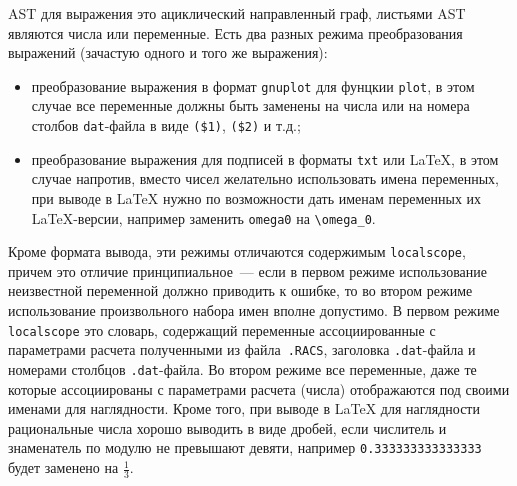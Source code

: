 \documentclass[12pt]{article}
\def\gnuplot{{\tt gnuplot}}
\begin{document}
AST для выражения это ациклический направленный граф, листьями AST являются числа или переменные. 
Есть два разных режима преобразования выражений (зачастую одного и того же выражения):
\begin{itemize}
\item преобразование выражения в формат \gnuplot{} для фунцкии \verb'plot',  в этом случае все переменные должны быть заменены на числа
  или на номера столбов \verb'dat'-файла  в виде \verb'($1)', \verb'($2)' и т.д.;
\item преобразование выражения для подписей в форматы \verb'txt' или \LaTeX{}, в этом случае напротив, вместо чисел желательно использовать имена переменных,
 при выводе в \LaTeX{} нужно по возможности дать именам переменных их \LaTeX-версии, например заменить \verb'omega0' на \verb'\omega_0'.
\end{itemize}
Кроме формата вывода, эти режимы отличаются содержимым \verb'localscope', причем это отличие принципиальное~--- если в первом режиме
использование неизвестной переменной должно приводить к ошибке, то во втором режиме использование произвольного набора имен вполне допустимо.
В первом режиме \verb'localscope' это словарь, содержащий переменные ассоциированные с параметрами расчета полученными из файла~\verb'.RACS',
заголовка \verb'.dat'-файла и номерами столбцов \verb'.dat'-файла. Во втором режиме все переменные, даже те которые ассоциированы с параметрами расчета (числа)
отображаются под своими именами для наглядности. Кроме того, при выводе в \LaTeX{} для наглядности рациональные числа хорошо выводить в виде дробей,
если числитель и знаменатель по модулю не превышают девяти, например \verb'0.333333333333333' будет заменено на $\frac13$.
\end{document}
